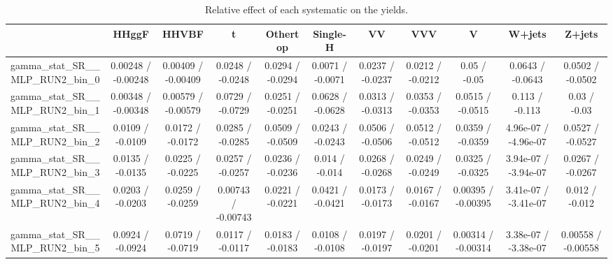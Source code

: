 \documentclass[10pt]{article}
\begin{document}
\begin{table}[htbp]
\begin{center}
\begin{tabular}{|c|c|c|c|c|c|c|c|c|c|c|}
\hline 
      & HHggF      & HHVBF      & t      & Othertop      & Single-H      & VV      & VVV      & V      & W+jets      & Z+jets \\ 
\hline 
  gamma_stat_SR__MLP_RUN2_bin_0 & 0.00248 / -0.00248 & 0.00409 / -0.00409 & 0.0248 / -0.0248 & 0.0294 / -0.0294 & 0.0071 / -0.0071 & 0.0237 / -0.0237 & 0.0212 / -0.0212 & 0.05 / -0.05 & 0.0643 / -0.0643 & 0.0502 / -0.0502 \\ 
  gamma_stat_SR__MLP_RUN2_bin_1 & 0.00348 / -0.00348 & 0.00579 / -0.00579 & 0.0729 / -0.0729 & 0.0251 / -0.0251 & 0.0628 / -0.0628 & 0.0313 / -0.0313 & 0.0353 / -0.0353 & 0.0515 / -0.0515 & 0.113 / -0.113 & 0.03 / -0.03 \\ 
  gamma_stat_SR__MLP_RUN2_bin_2 & 0.0109 / -0.0109 & 0.0172 / -0.0172 & 0.0285 / -0.0285 & 0.0509 / -0.0509 & 0.0243 / -0.0243 & 0.0506 / -0.0506 & 0.0512 / -0.0512 & 0.0359 / -0.0359 & 4.96e-07 / -4.96e-07 & 0.0527 / -0.0527 \\ 
  gamma_stat_SR__MLP_RUN2_bin_3 & 0.0135 / -0.0135 & 0.0225 / -0.0225 & 0.0257 / -0.0257 & 0.0236 / -0.0236 & 0.014 / -0.014 & 0.0268 / -0.0268 & 0.0249 / -0.0249 & 0.0325 / -0.0325 & 3.94e-07 / -3.94e-07 & 0.0267 / -0.0267 \\ 
  gamma_stat_SR__MLP_RUN2_bin_4 & 0.0203 / -0.0203 & 0.0259 / -0.0259 & 0.00743 / -0.00743 & 0.0221 / -0.0221 & 0.0421 / -0.0421 & 0.0173 / -0.0173 & 0.0167 / -0.0167 & 0.00395 / -0.00395 & 3.41e-07 / -3.41e-07 & 0.012 / -0.012 \\ 
  gamma_stat_SR__MLP_RUN2_bin_5 & 0.0924 / -0.0924 & 0.0719 / -0.0719 & 0.0117 / -0.0117 & 0.0183 / -0.0183 & 0.0108 / -0.0108 & 0.0197 / -0.0197 & 0.0201 / -0.0201 & 0.00314 / -0.00314 & 3.38e-07 / -3.38e-07 & 0.00558 / -0.00558 \\ 
\hline 
\end{tabular} 
\caption{Relative effect of each systematic on the yields.} 
\end{center} 
\end{table} 
\end{document}
